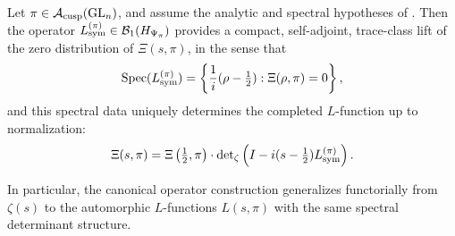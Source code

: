 \begin{corollary}
\label{cor:functorial_lifting_spec_encoding}
Let \( \pi \in \mathcal{A}_{\mathrm{cusp}}(\mathrm{GL}_n) \), and assume the analytic and spectral hypotheses of . Then the operator \( L_{\mathrm{sym}}^{(\pi)} \in \mathcal{B}_1(H_{\Psi_{\pi}}) \) provides a compact, self-adjoint, trace-class lift of the zero distribution of \( \Xi(s, \pi) \), in the sense that
\[
\operatorname{Spec}(L_{\mathrm{sym}}^{(\pi)}) = \left\{ \frac{1}{i}(\rho - \tfrac{1}{2}) : \Xi(\rho, \pi) = 0 \right\},
\]
and this spectral data uniquely determines the completed \( L \)-function up to normalization:
\[
\Xi(s, \pi) = \Xi\left(\tfrac{1}{2}, \pi\right) \cdot \det\nolimits_{\zeta}\left(I - i(s - \tfrac{1}{2}) L_{\mathrm{sym}}^{(\pi)} \right).
\]

In particular, the canonical operator construction generalizes functorially from \( \zeta(s) \) to the automorphic \( L \)-functions \( L(s, \pi) \) with the same spectral determinant structure.
\end{corollary}
